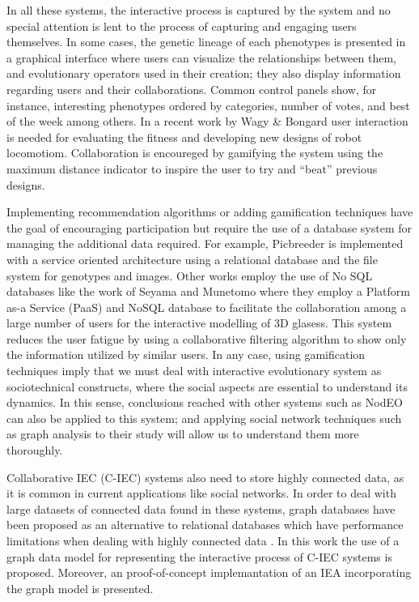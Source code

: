 \documentclass[conference]{IEEEtran}
\begin{document}
In all these systems, the interactive process is captured by the
system and no special attention is lent to the process of capturing
and engaging users themselves. In some cases, the genetic lineage of each
phenotypes is presented in a graphical interface 
where users can visualize the relationships between them, and evolutionary operators used in
their creation; they also display information regarding users and
their collaborations.  Common control panels  show, for instance,  
interesting phenotypes ordered by categories, number of votes, and
best of the week among others. In a recent work by 
Wagy \& Bongard \cite{wagy2014collective} user interaction is needed for evaluating the fitness and developing
new designs of robot locomotiom. Collaboration is encoureged by gamifying the system 
using the maximum distance indicator to inspire the user to try and “beat” previous designs. 

Implementing recommendation algorithms or adding gamification techniques have the goal of encouraging participation 
but require the use of a database system for managing the additional data required. 
For example, Picbreeder \cite{picbreeder} is implemented with a service oriented
architecture using a relational database and the file system for genotypes and images. Other works employ the 
use of No SQL databases like the work of Seyama and Munetomo \cite{seyama2016development} where they
employ a Platform as-a Service (PaaS) and NoSQL database to facilitate the collaboration 
among a large number of users for the interactive modelling of 3D glasess.  This system reduces the user fatigue
by using a collaborative filtering algorithm to show only the
information utilized by similar users. In any case, using gamification
techniques imply that we must deal with interactive evolutionary
system as sociotechnical constructs, where the social aspects are
essential to understand its dynamics. In this sense, conclusions
reached with other systems such as NodEO
\cite{DBLP:conf/gecco/MereloCGCRV16} can also be applied to this
system; and applying social network techniques such as graph analysis
to their study will allow us to understand them more thoroughly. 

Collaborative IEC (C-IEC) systems also need to store highly connected data, as it is common in current applications
like social networks. In order to deal with large datasets of connected data found in these systems,
graph databases \cite{angles2012comparison} have been proposed as an alternative to relational databases 
which have performance limitations when dealing with highly connected data \cite{holzschuher2013performance}.
In this work the use of a graph data model for representing the interactive process of C-IEC systems is proposed.
Moreover, an proof-of-concept implemantation of an IEA incorporating the graph model is presented.
\end{document}
